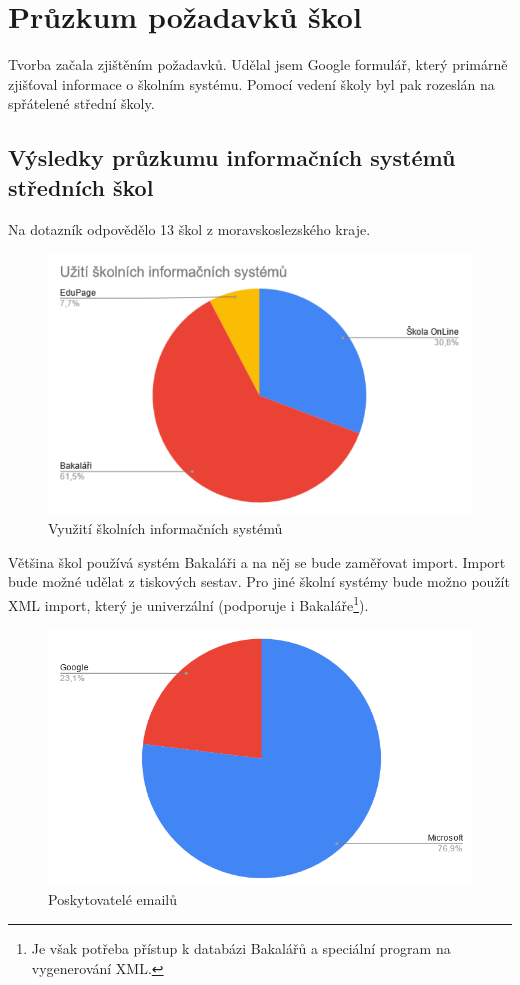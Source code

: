 \section{Průzkum požadavků škol}
Tvorba začala zjištěním požadavků. Udělal jsem Google formulář, který primárně zjišťoval informace o školním systému. Pomocí vedení školy byl pak rozeslán na spřátelené střední školy. 
\subsection{Výsledky průzkumu informačních systémů středních škol}
Na dotazník odpovědělo 13 škol z moravskoslezského kraje.

\begin{figure}[h]
    \centering
    \includegraphics[width=0.5\linewidth]{Figures/vyuziti_skolnich_systemu.PNG}
    \caption{Využití školních informačních systémů}
    \label{fig:vyuziti-skolnich-systemu}
\end{figure}

Většina škol používá systém Bakaláři a na něj se bude zaměřovat import. Import bude možné udělat z tiskových sestav. Pro jiné školní systémy bude možno použít XML import, který je univerzální (podporuje i Bakaláře\footnote{Je však potřeba přístup k databázi Bakalářů a speciální program na vygenerování XML.}).


\newpage

\begin{figure}[t]
    \centering
    \includegraphics[width=0.5\linewidth]{Figures/poskytovatele_emailu.PNG}
    \caption{Poskytovatelé emailů}
    \label{fig:poskytovatele-emailu}
\end{figure}

